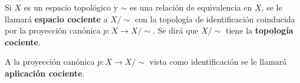 

\begin{definition}
Si $X$ es un espacio topológico y $\sim$ es una relación de equivalencia en $X$, se le llamará \textbf{espacio cociente} a $X/\sim$ con la topología de identificación coinducida por la proyección canónica $p : X \longrightarrow X/\sim$. Se dirá que $X/\sim$ tiene la \textbf{topología cociente}.
\end{definition}

\begin{definition}
A la proyección canónica $p : X \longrightarrow X/\sim$ vista como identificación se le llamará \textbf{aplicación cociente}.
\end{definition}

